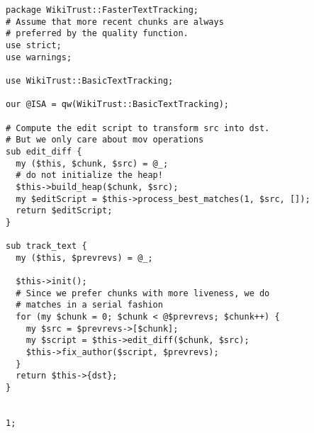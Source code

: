 \begin{lstlisting}
package WikiTrust::FasterTextTracking;
# Assume that more recent chunks are always
# preferred by the quality function.
use strict;
use warnings;

use WikiTrust::BasicTextTracking;

our @ISA = qw(WikiTrust::BasicTextTracking);

# Compute the edit script to transform src into dst.
# But we only care about mov operations
sub edit_diff {
  my ($this, $chunk, $src) = @_;
  # do not initialize the heap!
  $this->build_heap($chunk, $src);
  my $editScript = $this->process_best_matches(1, $src, []);
  return $editScript;
}

sub track_text {
  my ($this, $prevrevs) = @_;

  $this->init();
  # Since we prefer chunks with more liveness, we do
  # matches in a serial fashion
  for (my $chunk = 0; $chunk < @$prevrevs; $chunk++) {
    my $src = $prevrevs->[$chunk];
    my $script = $this->edit_diff($chunk, $src);
    $this->fix_author($script, $prevrevs);
  }
  return $this->{dst};
}


1;
\end{lstlisting}
